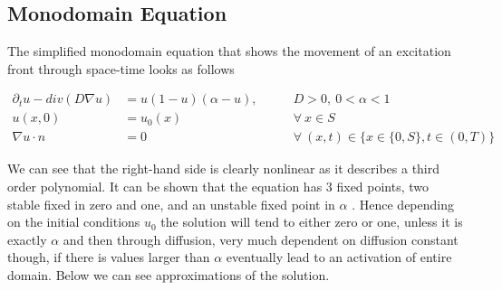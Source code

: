 \documentclass[../draft_1.tex]{subfiles}
\begin{document}
\subsection{Monodomain Equation}

The simplified monodomain equation that shows the movement of an excitation front through space-time looks as follows

\begin{ceqn}
	\begin{equation}
	\begin{aligned}
\partial_t u - div(D \nabla u) &= u (1 - u ) (\alpha - u), \qquad &D > 0, \ 0 < \alpha < 1 \\
u(x, 0) &= u_0(x) &\forall \ x \in S \\
\nabla u \cdot n &= 0 \qquad &\forall \ (x,t) \in \{ x \in \{0,S\}, t \in (0,T) \} 
	\end{aligned}
		\end{equation}
\end{ceqn}
We can see that the right-hand side is clearly nonlinear as it describes a third order polynomial. It can be shown that the equation has 3 fixed points, two stable fixed in zero and one, and an unstable fixed point in $\alpha$ \cite{deuflhard2011adaptive}. Hence depending on the initial conditions $u_0$ the solution will tend to either zero or one, unless it is exactly $\alpha$ and then through diffusion, very much dependent on diffusion constant though, if there is values larger than $\alpha$ eventually lead to an activation of entire domain. Below we can see approximations of the solution.
\end{document}
